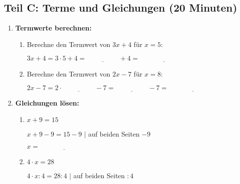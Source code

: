 \subsection*{Teil C: Terme und Gleichungen (20 Minuten)}

\begin{enumerate}[label=\arabic*.]
    \item \textbf{Termwerte berechnen:}
    \vspace{0.5cm}

    \begin{enumerate}[label=\alph*)]
        \item Berechne den Termwert von $3x + 4$ für $x = 5$:

        $3x + 4 = 3 \cdot 5 + 4 = \underline{\hspace{2cm}} + 4 = \underline{\hspace{3cm}}$

        \vspace{0.5cm}

        \item Berechne den Termwert von $2x - 7$ für $x = 8$:

        $2x - 7 = 2 \cdot \underline{\hspace{2cm}} - 7 = \underline{\hspace{2cm}} - 7 = \underline{\hspace{3cm}}$
    \end{enumerate}

    \vspace{1cm}

    \item \textbf{Gleichungen lösen:}
    \vspace{0.5cm}

    \begin{enumerate}[label=\alph*)]
        \item $x + 9 = 15$

        $x + 9 - 9 = 15 - 9$ \hspace{2cm} $|$ auf beiden Seiten $-9$

        $x = \underline{\hspace{3cm}}$

        \vspace{0.5cm}

        \item $4 \cdot x = 28$

        $4 \cdot x : 4 = 28 : 4$ \hspace{2cm} $|$ auf beiden Seiten $:4$


\end{enumerate}
\end{enumerate}
